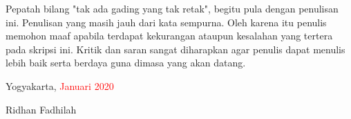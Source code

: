Pepatah bilang "tak ada gading yang tak retak", begitu pula dengan penulisan ini. Penulisan yang masih jauh dari kata sempurna. Oleh karena itu penulis memohon maaf apabila terdapat kekurangan ataupun kesalahan yang tertera pada skripsi ini. Kritik dan saran sangat diharapkan agar penulis dapat menulis lebih baik serta berdaya guna dimasa yang akan datang.
\newline

\begin{flushright}
Yogyakarta, \textcolor{red}{Januari 2020}
\end{flushright}
\vspace{0.5cm}
\begin{flushright}
Ridhan Fadhilah
\end{flushright}